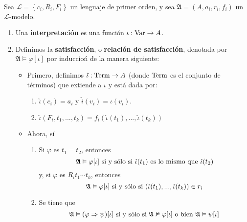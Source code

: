 \documentclass[12pt]{report}
\newcounter{it}
\theoremstyle{largebreak}
\newcommand\cf[3]{\ensuremath{#1:#2\rightarrow#3}}
\begin{document}
    \begin{mydef}
        Sea $\mathcal{L}=\left\{c_i,R_i,F_i \right\}$ un lenguaje de primer orden, y sea $\mathfrak{A}=(A,a_i,r_i,f_i)$ un $\mathcal{L}$-modelo.
        \begin{enumerate}[label=(\textit{\arabic*})]
            \item Una \textbf{interpretación} es una función $\cf{\iota}{\textup{Var}}{A}$.
            \item Definimos la \textbf{satisfacción}, o \textbf{relación de satisfacción}, denotada por $\mathfrak{A}\vDash\varphi[\iota]$ por induccioń de la manera siguiente:
            \begin{itemize}
                \item Primero, definimos $\cf{\hat{\iota}}{\textup{Term}}{A}$ (donde $\textup{Term}$ es el conjunto de términos) que extiende a $\iota$ y está dada por:
                \begin{enumerate}[label=(\textit{\alph*})]
                    \item $\hat{\iota}(c_i)=a_i$ y $\hat{i}(v_i)=\iota(v_i)$.
                    \item $\hat{\iota}(F_i,t_1,...,t_k)=f_i(\hat{\iota}(t_1),...,\hat{\iota}(t_k))$
                \end{enumerate}
                \item Ahora, sí
                \begin{enumerate}[label=(\textit{\alph*})]
                    \item Si $\varphi$ es $t_1=t_2$, entonces
                    \begin{equation*}
                        \mathfrak{A}\vDash\varphi[\iota]\textup{ si y sólo si }\hat{\iota}(t_1)\textup{ es lo mismo que }\hat{\iota}(t_2)
                    \end{equation*}
                    y, si $\varphi$ es $R_it_1\cdots t_k$, entonces
                    \begin{equation*}
                        \mathfrak{A}\vDash\varphi[\iota]\textup{ si y sólo si }(\hat{\iota}(t_1),...,\hat{\iota}(t_k))\in r_i
                    \end{equation*}
                    \item Se tiene que
                    \begin{equation*}
                        \mathfrak{A}\vDash(\varphi\Rightarrow\psi)[\iota]\textup{ si y sólo si }\mathfrak{A}\nvDash\varphi[\iota]\textup{ o bien }\mathfrak{A}\vDash\psi[\iota]
                    \end{equation*}

\end{enumerate}
\end{itemize}
\end{enumerate}
\end{mydef}
\end{document}

